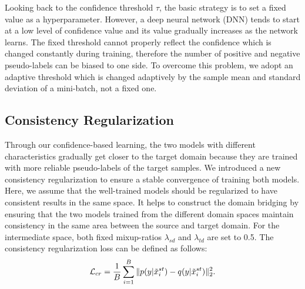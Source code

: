 \documentclass[final]{cvpr}
\begin{document}
Looking back to the confidence threshold $\tau$, the basic strategy is to set a fixed value as a hyperparameter.
However, a deep neural network (DNN) tends to start at a low level of confidence value and its value gradually increases as the network learns. The fixed threshold cannot properly reflect the confidence which is changed constantly during training, therefore the number of positive and negative pseudo-labels can be biased to one side. To overcome this problem, we adopt an adaptive threshold which is changed adaptively by the sample mean and standard deviation of a mini-batch, not a fixed one.

\subsection{Consistency Regularization}
Through our confidence-based learning, the two models with different characteristics gradually get closer to the target domain because they are trained with more reliable pseudo-labels of the target samples. We introduced a new consistency regularization to ensure a stable convergence of training both models. Here, we assume that the well-trained models should be regularized to have consistent results in the same space. It helps to construct the domain bridging by ensuring that the two models trained from the different domain spaces maintain consistency in the same area between the source and target domain. For the intermediate space, both fixed mixup-ratios $\lambda_{sd}$ and $\lambda_{td}$ are set to 0.5. The consistency regularization loss can be defined as follows:
\begin{equation}
     \mathcal{L}_{cr} = \frac{1}{B}\sum_{i=1}^{B}\Vert p(y|\Tilde{x}_i^{st}) - q(y|\Tilde{x}_i^{st}) \Vert^2_2.
\end{equation}
\end{document}
